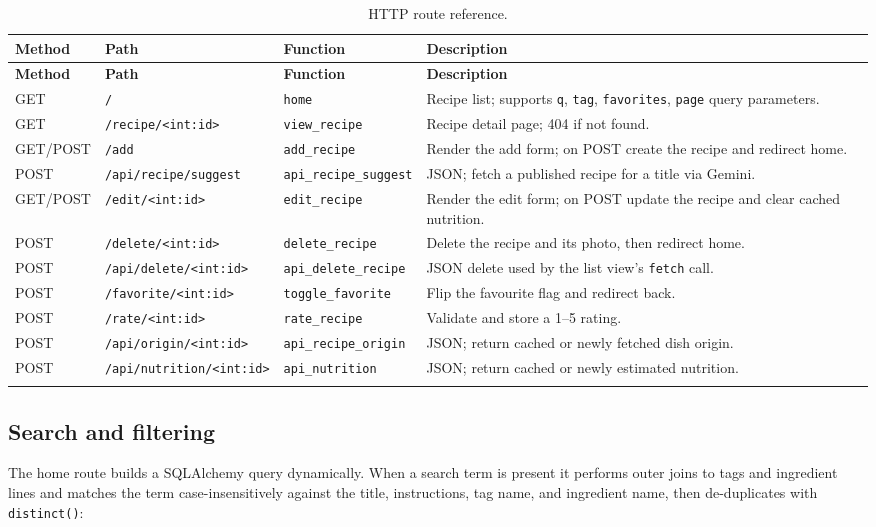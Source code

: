 \documentclass[11pt,a4paper]{article}
\newcommand{\code}[1]{\texttt{#1}}
\begin{document}
\begin{longtable}{@{}p{0.9cm}p{4.6cm}p{2.2cm}p{5.6cm}@{}}
\toprule
\textbf{Method} & \textbf{Path} & \textbf{Function} & \textbf{Description} \\
\midrule
\endfirsthead
\toprule
\textbf{Method} & \textbf{Path} & \textbf{Function} & \textbf{Description} \\
\midrule
\endhead
GET  & \code{/}                     & \code{home}            & Recipe list; supports \code{q}, \code{tag}, \code{favorites}, \code{page} query parameters. \\
GET  & \code{/recipe/<int:id>}      & \code{view\_recipe}    & Recipe detail page; 404 if not found. \\
GET/POST & \code{/add}             & \code{add\_recipe}     & Render the add form; on POST create the recipe and redirect home. \\
POST & \code{/api/recipe/suggest}   & \code{api\_recipe\_suggest} & JSON; fetch a published recipe for a title via Gemini. \\
GET/POST & \code{/edit/<int:id>}    & \code{edit\_recipe}    & Render the edit form; on POST update the recipe and clear cached nutrition. \\
POST & \code{/delete/<int:id>}      & \code{delete\_recipe}  & Delete the recipe and its photo, then redirect home. \\
POST & \code{/api/delete/<int:id>}  & \code{api\_delete\_recipe} & JSON delete used by the list view's \code{fetch} call. \\
POST & \code{/favorite/<int:id>}    & \code{toggle\_favorite} & Flip the favourite flag and redirect back. \\
POST & \code{/rate/<int:id>}        & \code{rate\_recipe}    & Validate and store a 1--5 rating. \\
POST & \code{/api/origin/<int:id>}  & \code{api\_recipe\_origin} & JSON; return cached or newly fetched dish origin. \\
POST & \code{/api/nutrition/<int:id>} & \code{api\_nutrition} & JSON; return cached or newly estimated nutrition. \\
\bottomrule
\caption{HTTP route reference.}
\end{longtable}

\subsection{Search and filtering}
The home route builds a SQLAlchemy query dynamically. When a search term is
present it performs outer joins to tags and ingredient lines and matches the
term case-insensitively against the title, instructions, tag name, and
ingredient name, then de-duplicates with \code{distinct()}:
\end{document}
